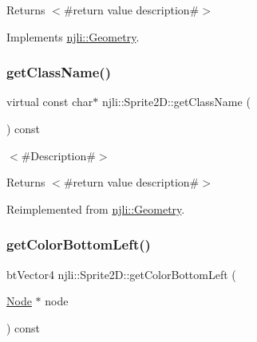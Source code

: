 \begin{DoxyReturn}{Returns}
$<$\#return value description\#$>$ 
\end{DoxyReturn}


Implements \mbox{\hyperlink{classnjli_1_1_geometry_a97ec03852997043d6900af8009b390d9}{njli\+::\+Geometry}}.

\mbox{\label{classnjli_1_1_sprite2_d_a6e82261effc23589cca219ddb5c90851}} 
\subsubsection{\texorpdfstring{get\+Class\+Name()}{getClassName()}}
{\footnotesize\ttfamily virtual const char$\ast$ njli\+::\+Sprite2\+D\+::get\+Class\+Name (\begin{DoxyParamCaption}{ }\end{DoxyParamCaption}) const\hspace{0.3cm}{\ttfamily [virtual]}}

$<$\#\+Description\#$>$

\begin{DoxyReturn}{Returns}
$<$\#return value description\#$>$ 
\end{DoxyReturn}


Reimplemented from \mbox{\hyperlink{classnjli_1_1_geometry_abfa3fe3b5680b7b40c650fdc7a7fb737}{njli\+::\+Geometry}}.

\mbox{\label{classnjli_1_1_sprite2_d_a8b4da784e9772e4f1baf564e95ea4410}} 
\subsubsection{\texorpdfstring{get\+Color\+Bottom\+Left()}{getColorBottomLeft()}}
{\footnotesize\ttfamily bt\+Vector4 njli\+::\+Sprite2\+D\+::get\+Color\+Bottom\+Left (\begin{DoxyParamCaption}\item[{\mbox{\hyperlink{classnjli_1_1_node}{Node}} $\ast$}]{node }\end{DoxyParamCaption}) const}


